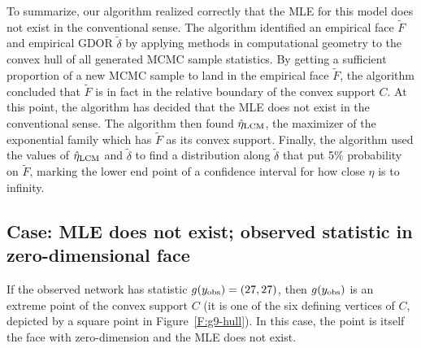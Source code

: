To summarize, our algorithm realized correctly that the MLE for 
this model does not exist in the conventional sense.
The algorithm identified an empirical face $\tilde{F}$ and empirical GDOR $\tilde{\delta}$
by applying methods in computational geometry to the convex hull of all generated MCMC sample statistics.
By getting a sufficient proportion of a new MCMC sample to land in the empirical face $\tilde{F}$,
the algorithm concluded that $\tilde{F}$ is in fact in the relative boundary of the convex support $C$.
At this point, the algorithm has decided that the MLE does not exist in the conventional sense.
The algorithm then found $\hat{\eta}_{\textrm{LCM}}$, the maximizer of the exponential family which has 
$\tilde{F}$ as its convex support.    
Finally, the algorithm used the values of $\hat{\eta}_{\textrm{LCM}}$ and $\tilde{\delta}$ to find a distribution along 
$\tilde{\delta}$ that put 5\% probability on $\tilde{F}$, marking the lower end point of a confidence
interval for how close $\eta$ is to infinity.

\subsection{Case: MLE does not exist; observed statistic in zero-dimensional face}
If the observed network has statistic $g(y_{\text{obs}}) = (27, 27)$,  then 
$g(y_{\text{obs}})$ is an extreme point
of the convex support $C$ (it is one of the six defining vertices of $C$, depicted by
a square point in Figure~\ref{F:g9-hull}).  In this case, the point is itself the 
face with zero-dimension and the MLE does not exist.  

